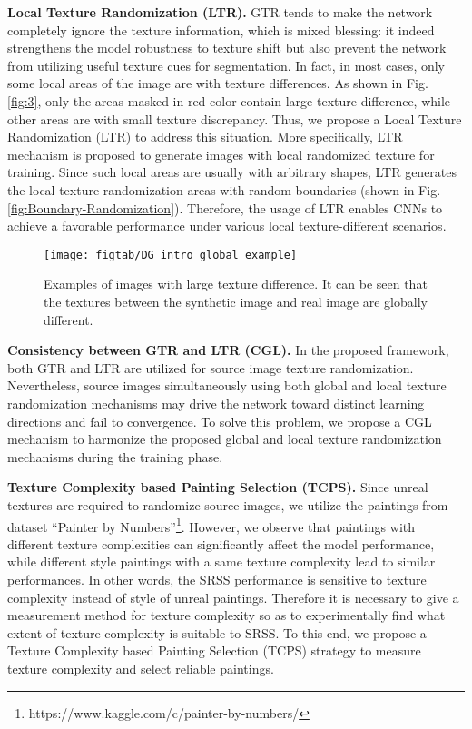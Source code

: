 \documentclass[twocolumn,journal,vlined,ruled,linesnumbered]{IEEEtran}
\begin{document}
\textbf{Local Texture Randomization (LTR). }GTR tends to make the network completely ignore the texture information, which is mixed blessing: it indeed strengthens the model robustness to texture shift but also prevent the network from utilizing useful texture cues for segmentation. In fact, in most cases, only some local areas of the image are with texture differences. As shown in Fig. \ref{fig:3}, only the areas masked in red color contain large texture difference, while other areas are with small texture discrepancy. Thus, we propose a Local Texture Randomization (LTR) to address this situation. More specifically, LTR mechanism is proposed to generate images with local randomized texture for training. Since such local areas are usually with arbitrary shapes, LTR generates the local texture randomization areas with random boundaries (shown in Fig. \ref{fig:Boundary-Randomization}). Therefore, the usage of LTR enables CNNs to achieve a favorable performance under various local texture-different scenarios.

\begin{figure}[t]
\begin{centering}
\texttt{[image: figtab/DG\_intro\_global\_example]}
\par\end{centering}
\vspace{-2mm}
\caption{Examples of images with large texture difference. It can be seen that the textures between the synthetic image and real image are globally different. \label{fig:Examples-of-images}}
\vspace{-6mm}
\end{figure}

\textbf{Consistency between GTR and LTR (CGL).} In the proposed framework, both GTR and LTR are utilized for source image texture randomization. Nevertheless, source images simultaneously using both global and local texture randomization mechanisms may drive the network toward distinct learning directions and fail to convergence. To solve this problem, we propose a CGL mechanism to harmonize the proposed global and local texture randomization mechanisms during the training phase.

\textbf{Texture Complexity based Painting Selection (TCPS).} Since unreal textures are required to randomize source images, we utilize the paintings from dataset ``Painter by Numbers\textquotedblright \footnote{https://www.kaggle.com/c/painter-by-numbers/}. However, we observe that paintings with different texture complexities can significantly affect the model performance, while different style paintings with a same texture complexity lead to similar performances. In other words, the SRSS performance is sensitive to texture complexity instead of style of unreal paintings. Therefore it is necessary to give a measurement method for texture complexity so as to experimentally find what extent of texture complexity is suitable to SRSS. To this end, we propose a Texture Complexity based Painting Selection (TCPS) strategy to measure texture complexity and select reliable paintings.
\end{document}
